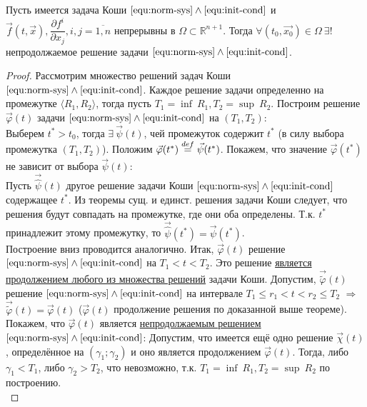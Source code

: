 \begin{theorem}
    Пусть имеется задача Коши $\eqref{equ:norm-sys} \wedge \eqref{equ:init-cond}$ и $\vec{f}(t, \vec{x}), \dfrac{\partial f^i}{\partial x_j}, i, j = \overline{1, n}$ непрерывны в $\Omega \subset \mathbb{R}^{n+1}$. Тогда $\forall (t_0, \vec{x_0}) \in \Omega \ \exists!$ непродолжаемое решение задачи $\eqref{equ:norm-sys} \wedge \eqref{equ:init-cond}$.
\end{theorem}
\begin{proof}
    Рассмотрим множество решений задач Коши $\eqref{equ:norm-sys} \wedge \eqref{equ:init-cond}$. Каждое решение задачи определенно на промежутке $\langle R_1, R_2 \rangle$, тогда пусть $T_1 = \inf\ R_1, T_2 = \sup\ R_2$. Построим решение $\vec{\varphi}(t)$ задачи $\eqref{equ:norm-sys} \wedge \eqref{equ:init-cond}$ на $(T_1, T_2)$:\\
    Выберем $t^* > t_0$, тогда $\exists\ \vec{\psi}(t)$, чей промежуток содержит $t^*$ (в силу выбора промежутка $(T_1, T_2)$). Положим $\vec{\varphi}(t^*) \stackrel{def}{=} \vec{\psi}(t^*)$. Покажем, что значение $\vec{\varphi}(t^*)$ не зависит от выбора $\vec{\psi}(t)$:\\
    Пусть $\displaystyle \vec{\hat{\psi}}(t)$ другое решение задачи Коши $\eqref{equ:norm-sys} \wedge \eqref{equ:init-cond}$ содержащее $t^*$. Из теоремы сущ. и единст. решения задачи Коши следует, что решения будут совпадать на промежутке, где они оба определены. Т.к. $t^*$ принадлежит этому промежутку, то $\vec{\hat{\psi}}(t^*) = \vec{\psi}(t^*)$.\\ 
    Построение вниз проводится аналогично. Итак, $\vec{\varphi}(t)$ решение $\eqref{equ:norm-sys} \wedge \eqref{equ:init-cond}$ на $T_1 < t < T_2$. Это решение \underline{является продолжением любого из множества решений} задачи Коши. Допустим, $\vec{\widetilde{\varphi}}(t)$ решение $\eqref{equ:norm-sys} \wedge \eqref{equ:init-cond}$ на интервале $T_1 \leqslant r_1 < t < r_2 \leqslant T_2$ $\Rightarrow$ $\vec{\widetilde{\varphi}}(t) = \vec{\varphi}(t)$ ($\vec{\varphi}(t)$ продолжение решения по доказанной выше теореме). \\Покажем, что $\vec{\varphi}(t)$ является \underline{непродолжаемым решением} $\eqref{equ:norm-sys} \wedge \eqref{equ:init-cond}$:
    Допустим, что имеется ещё  одно решение $\vec{\chi}(t)$, определённое на $(\gamma_1; \gamma_2)$ и оно является продолжением $\vec{\varphi}(t)$. Тогда, либо $\gamma_1 < T_1$, либо $\gamma_2 > T_2$, что невозможно, т.к. $T_1 = \inf\ R_1, T_2 = \sup\ R_2$ по построению. \\

\end{proof}
